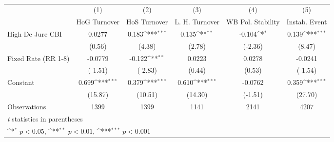 \begin{table}[htbp]\centering
\def\sym#1{\ifmmode^{#1}\else\(^{#1}\)\fi}
\caption{\label{binaryIndOLSDJ}}
\begin{tabular}{l*{5}{c}}
\toprule
                                        &\multicolumn{1}{c}{(1)}&\multicolumn{1}{c}{(2)}&\multicolumn{1}{c}{(3)}&\multicolumn{1}{c}{(4)}&\multicolumn{1}{c}{(5)}\\
                                        &\multicolumn{1}{c}{HoG Turnover}&\multicolumn{1}{c}{HoS Turnover}&\multicolumn{1}{c}{L. H. Turnover}&\multicolumn{1}{c}{WB Pol. Stability}&\multicolumn{1}{c}{Instab. Event}\\
\midrule
High De Jure CBI                        &   0.0277         &    0.183\sym{***}&    0.135\sym{**} &   -0.104\sym{*}  &    0.139\sym{***}\\
                                        &   (0.56)         &   (4.38)         &   (2.78)         &  (-2.36)         &   (8.47)         \\
\addlinespace
Fixed Rate (RR 1-8)                     &  -0.0779         &   -0.122\sym{**} &   0.0223         &   0.0278         &  -0.0241         \\
                                        &  (-1.51)         &  (-2.83)         &   (0.44)         &   (0.53)         &  (-1.54)         \\
\addlinespace
Constant                                &    0.699\sym{***}&    0.379\sym{***}&    0.610\sym{***}&  -0.0762         &    0.359\sym{***}\\
                                        &  (15.87)         &  (10.51)         &  (14.30)         &  (-1.51)         &  (27.70)         \\
\midrule
Observations                            &     1399         &     1399         &     1141         &     2141         &     4207         \\
\bottomrule
\multicolumn{6}{l}{\footnotesize \textit{t} statistics in parentheses}\\
\multicolumn{6}{l}{\footnotesize \sym{*} \(p<0.05\), \sym{**} \(p<0.01\), \sym{***} \(p<0.001\)}\\
\end{tabular}
\end{table}
